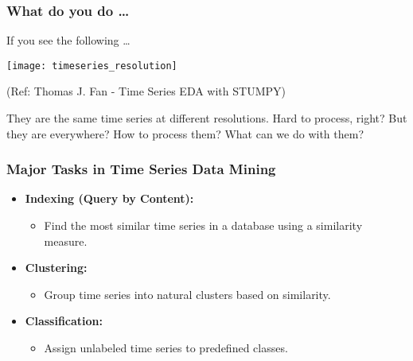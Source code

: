 \begin{frame}[fragile]\frametitle{What do you do \ldots}
If you see the following \ldots
      \begin{center}
        \texttt{[image: timeseries\_resolution]}

		{\tiny (Ref: Thomas J. Fan - Time Series EDA with STUMPY)}		
        \end{center}
	
They are the same time series at different resolutions. Hard to process, right? But they are everywhere? How to process them? What can we do with them?	
\end{frame}


\begin{frame}[fragile]\frametitle{Major Tasks in Time Series Data Mining}
    \begin{itemize}
        \item \textbf{Indexing (Query by Content):}
            \begin{itemize}
                \item Find the most similar time series in a database using a similarity measure.
            \end{itemize}
        \item \textbf{Clustering:}
            \begin{itemize}
                \item Group time series into natural clusters based on similarity.
            \end{itemize}
        \item \textbf{Classification:}
            \begin{itemize}
                \item Assign unlabeled time series to predefined classes.
            \end{itemize}
    \end{itemize}
\end{frame}

